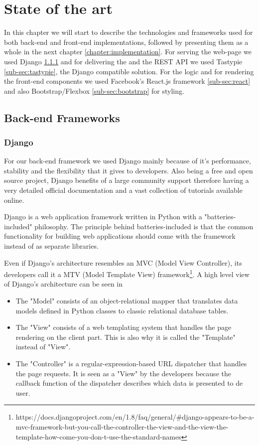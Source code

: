 \chapter{State of the art}
\label{chapter:state}

In this chapter we will start to describe the technologies and frameworks used for both back-end and front-end implementations, followed by presenting them as a whole in the next chapter \ref{chapter:implementation}. For serving the web-page we used Django \ref{sub-sec:django} and for delivering the and the REST API we used Tastypie \ref{sub-sec:tastypie}, the Django compatible solution. For the logic and for rendering the front-end components we used Facebook's React.js framework \ref{sub-sec:react} and also Bootstrap/Flexbox \ref{sub-sec:bootstrap} for styling.

\section{Back-end Frameworks}
\label{sec:backend}

\subsection{Django}
\label{sub-sec:django}

For our back-end framework we used Django mainly because of it's performance, stability and the flexibility that it gives to developers. Also being a free and open source project, Django benefits of a large community support therefore having a very detailed official documentation and a vast collection of tutorials available online.

Django is a web application framework written in Python with a "batteries-included" philosophy. The principle behind batteries-included is that the common functionality for building web applications should come with the framework instead of as separate libraries.

Even if Django's architecture resembles an MVC (Model View Controller), its developers call it a MTV (Model Template View) framework\footnote{https://docs.djangoproject.com/en/1.8/faq/general/\#django-appears-to-be-a-mvc-framework-but-you-call-the-controller-the-view-and-the-view-the-template-how-come-you-don-t-use-the-standard-names\label{note1}}. A high level view of Django's architecture can be seen in
\begin{itemize}
	\item The "Model" consists of an object-relational mapper that translates data models defined in Python classes to classic relational database tables.
	\item The "View" consists of a web templating system that handles the page rendering on the client part. This is also why it is called the "Template" instead of "View".
	\item The "Controller" is a regular-expression-based URL dispatcher that handles the page requests. It is seen as a "View" by the developers because the callback function of the dispatcher describes which data is presented to de user.
\end{itemize}

